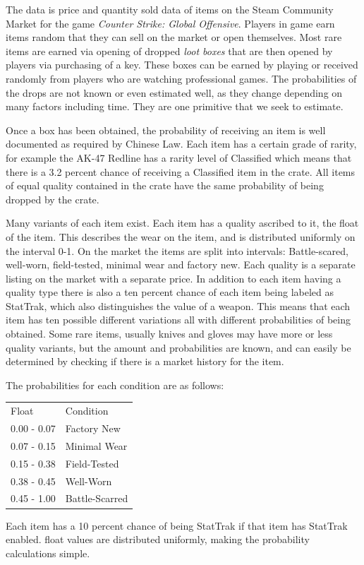 \documentclass[12pt, letterpaper]{paper}
\begin{document}
The data is price and quantity sold data of items on the Steam
Community Market for the game \emph{Counter Strike: Global
Offensive}. Players in game earn items random that they can sell on
the market or open themselves. Most rare items are earned via opening
of dropped \emph{loot boxes} that are then opened by players via purchasing
of a key. These boxes can be earned by playing or received randomly
from players who are watching professional games. The probabilities of
the drops are not known or even estimated well, as they change
depending on many factors including time. They are one primitive that
we seek to estimate. 

Once a box has been obtained, the probability of receiving an
item is well documented as required by Chinese Law. Each item has a
certain grade of rarity, for example the AK-47 Redline has a rarity
level of Classified which means that there is a 3.2 percent chance of
receiving a Classified item in the crate. All items of equal quality
contained in the crate have the same probability of being dropped by
the crate.

Many variants of each item exist. Each item has a quality
ascribed to it, the float of the item. This describes the wear on the
item, and is distributed uniformly on the interval 0-1. On the market
the items are split into intervals: Battle-scared, well-worn,
field-tested, minimal wear and factory new. Each quality is a separate
listing on the market with a separate price. In addition to each item
having a quality type there is also a ten percent chance of each item being
labeled as StatTrak, which also distinguishes the value of a
weapon. This means that each item has ten possible different variations
all with different probabilities of being obtained. Some rare items,
usually knives and gloves may have more or less quality variants, but the
amount and probabilities are known, and can easily be determined by
checking if there is a market history for the item.

The probabilities for each condition are as follows:
\begin{center}
\begin{tabular}{ll}
Float & Condition\\
0.00 - 0.07 & Factory New\\
0.07 - 0.15 & Minimal Wear\\
0.15 - 0.38 & Field-Tested\\
0.38 - 0.45 & Well-Worn\\
0.45 - 1.00 & Battle-Scarred\\
\end{tabular}
\end{center}
Each item has a 10 percent chance of being StatTrak if that item has StatTrak
enabled. float values are distributed uniformly, making the
probability calculations simple.
\end{document}
